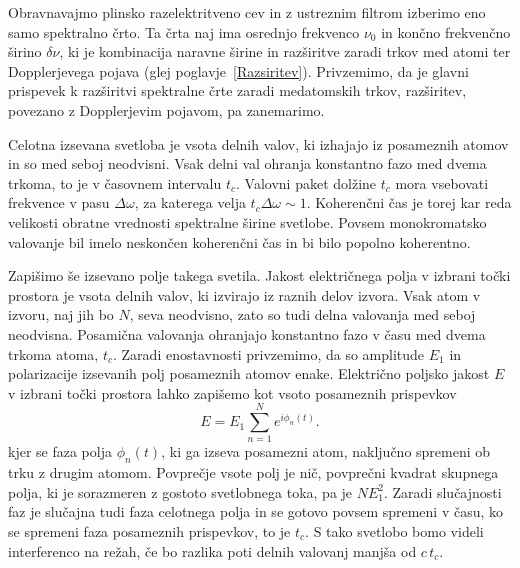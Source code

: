 Obravnavajmo plinsko razelektritveno cev in z
ustreznim filtrom izberimo eno samo spektralno črto. Ta črta naj ima
osrednjo frekvenco $\nu_{0}$ in končno frekvenčno širino $\delta\nu$,
ki je kombinacija naravne širine in razširitve zaradi trkov med atomi
ter Dopplerjevega pojava (glej poglavje~\ref{Razsiritev}). Privzemimo,
da je glavni prispevek k razširitvi spektralne črte zaradi med\-atomskih
trkov, razširitev, povezano z Dopplerjevim pojavom, pa zanemarimo.

Celotna izsevana svetloba je vsota delnih valov, ki izhajajo iz posameznih
atomov in so med seboj neodvisni. Vsak delni val ohranja konstantno
fazo med dvema trkoma, to je v časovnem intervalu $t_{c}$. Valovni
paket dolžine $t_{c}$ mora vsebovati frekvence v pasu $\Delta\omega$,
za katerega velja $t_{c}\Delta\omega\sim1$. Koherenčni čas je torej
kar reda velikosti obratne vrednosti spektralne širine svetlobe. Povsem
monokromatsko valovanje bil imelo neskončen koherenčni čas in bi bilo
popolno koherentno.

Zapišimo še izsevano polje takega svetila. 
Jakost električnega polja v izbrani točki prostora je vsota delnih
valov, ki izvirajo iz raznih delov izvora. Vsak atom v izvoru, naj
jih bo $N$, seva neodvisno, zato so tudi delna valovanja med seboj
neodvisna. Posamična valovanja ohranjajo konstantno fazo v času med
dvema trkoma atoma, $t_{c}$. Zaradi enostavnosti privzemimo,
da so amplitude $E_{1}$ in polarizacije izsevanih polj posameznih atomov enake. 
Električno poljsko jakost $E$ v izbrani točki prostora lahko 
zapišemo kot vsoto posameznih prispevkov
\begin{equation}
E=E_{1}\sum_{n=1}^{N}e^{i\phi_{n}(t)}.
\label{eq:amplituda-random}
\end{equation}
kjer se faza polja $\phi_{n}(t)$, ki ga izseva posamezni atom, naključno
spremeni ob trku z drugim atomom. Povprečje vsote polj je nič, 
povprečni kvadrat skupnega polja, ki je sorazmeren
z gostoto svetlobnega toka, pa je $NE_{1}^{2}$. Zaradi slučajnosti faz je 
slučajna tudi faza celotnega polja in se gotovo povsem spremeni v času, ko se
spremeni faza posameznih prispevkov, to je $t_{c}$. S tako svetlobo bomo videli 
interferenco na režah, če bo razlika poti delnih valovanj manjša od $c\, t_{c}$.

